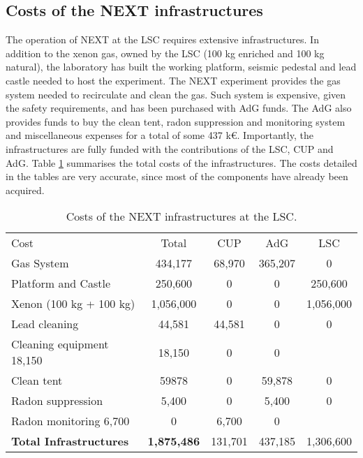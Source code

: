 \subsection{Costs of the NEXT infrastructures}
The operation of NEXT at the LSC requires extensive infrastructures. In addition to the xenon gas, owned by the LSC (100 kg enriched and 100 kg natural), the laboratory has built the working platform, seismic pedestal and lead castle needed to host the experiment. The NEXT experiment provides the gas system needed to recirculate and clean the gas. Such system is expensive, given the safety requirements, and has been purchased with AdG funds. The AdG also provides funds to buy the clean tent, radon suppression and monitoring system and miscellaneous expenses for a total of some
437 k\euro. Importantly, the infrastructures are fully funded with the contributions of the LSC, CUP and AdG. 
Table \ref{tab.n100:INFRA} summarises the total costs of the infrastructures. The costs detailed in the tables are very accurate, since most of the components have already been acquired. 


  
\begin{table}[h!]
\begin{center}
\begin{tabular}{|l|c|c|c|c|}
\hline
 Cost &	Total& 	CUP & AdG &  LSC \\
 \vline
Gas System &	434,177 &	68,970 &	365,207 &	0 \\
Platform and Castle	& 250,600 & 	0	&0 &	250,600 \\
Xenon (100 kg + 100 kg)	&1,056,000	& 0 & 0 &	1,056,000 \\
Lead cleaning	& 44,581 &44,581 &	0 & 0 \\
Cleaning equipment	18,150	& 18,150	& 0	& 0	\\
Clean tent	 & 59878	&	0& 59,878 &	0	\\
Radon suppression 	& 5,400 &	0 &	5,400 &	0	\\
Radon monitoring	6,700 &	0	& 6,700	& 0	\\
 \hline
{\bf Total Infrastructures} &	{\bf1,875,486}& 131,701& 437,185 & 1,306,600 \\	
 \hline\hline
\end{tabular}  
\caption{Costs of the NEXT infrastructures at the LSC.}
\label{tab.n100:INFRA}
\end{center}
\end{table} 

